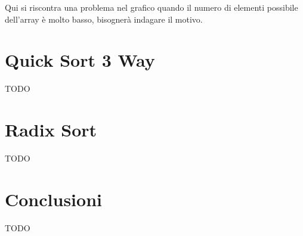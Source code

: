 \documentclass[a4paper, 12pt, oneside]{book}
\begin{document}
\noindent Qui si riscontra una problema nel grafico quando il numero di elementi possibile dell'array è molto basso, bisognerà indagare il motivo.


\chapter{Quick Sort 3 Way}\label{chap:Quick Sort 3 Way} %

TODO


\chapter{Radix Sort}\label{chap:Radix Sort} %

TODO


\chapter{Conclusioni}\label{chap:Conclusioni} %

TODO

\end{document}
